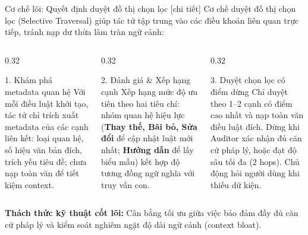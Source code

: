\documentclass[aspectratio=169,10pt]{beamer}
\begin{document}
\begin{frame}{Cơ chế lõi: Quyết định duyệt đồ thị chọn lọc [chi tiết]}
{\small Cơ chế duyệt đồ thị chọn lọc (Selective Traversal) giúp tác tử tập trung vào các điều khoản liên quan trực tiếp, tránh nạp dư thừa làm tràn ngữ cảnh:}
\vskip0.2cm
\begin{columns}[T]
\begin{column}{0.32\textwidth}
\begin{block}{\small 1. Khám phá metadata quan hệ}
\footnotesize Với mỗi điều luật khởi tạo, tác tử chỉ trích xuất metadata của các cạnh liên kết: loại quan hệ, số hiệu văn bản đích, trích yếu tiêu đề; chưa nạp toàn văn để tiết kiệm context.
\end{block}
\end{column}
\begin{column}{0.32\textwidth}
\begin{block}{\small 2. Đánh giá \& Xếp hạng cạnh}
\footnotesize Xếp hạng mức độ ưu tiên theo hai tiêu chí: nhóm quan hệ hiệu lực (\textbf{Thay thế, Bãi bỏ, Sửa đổi} để cập nhật luật mới nhất; \textbf{Hướng dẫn} để lấy biểu mẫu) kết hợp độ tương đồng ngữ nghĩa với truy vấn con.
\end{block}
\end{column}
\begin{column}{0.32\textwidth}
\begin{block}{\small 3. Duyệt chọn lọc có điểm dừng}
\footnotesize Chỉ duyệt theo 1--2 cạnh có điểm cao nhất và nạp toàn văn điều luật đích. Dừng khi Auditor xác nhận đủ căn cứ pháp lý, hoặc đạt độ sâu tối đa (2 hops). Chủ động hỏi người dùng khi thiếu dữ kiện.
\end{block}
\end{column}
\end{columns}
\vskip0.15cm
{\footnotesize \textcolor{hcmutblue}{\textbf{Thách thức kỹ thuật cốt lõi:}} Cân bằng tối ưu giữa việc bảo đảm đầy đủ căn cứ pháp lý và kiểm soát nghiêm ngặt độ dài ngữ cảnh (context bloat).}
\end{frame}
\end{document}

